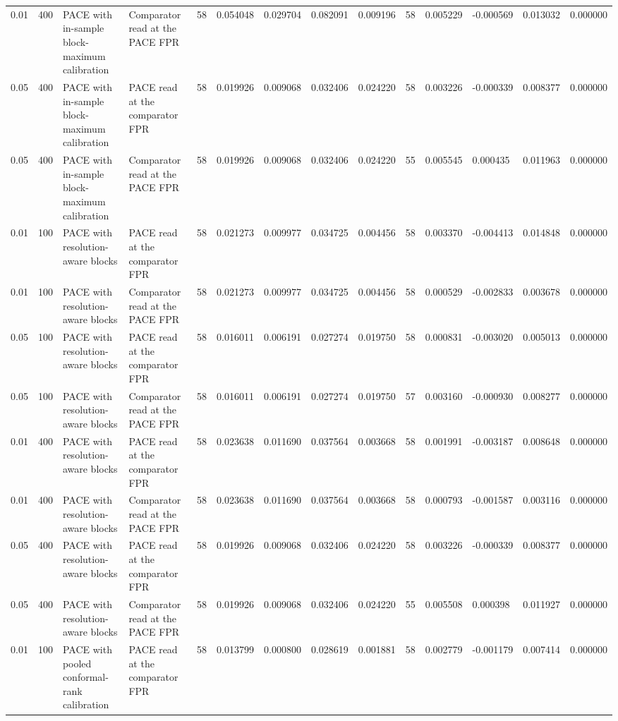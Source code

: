 \begin{tabular}{llllllllllllll}
0.01 & 400 & PACE with in-sample block-maximum calibration & Comparator read at the PACE FPR & 58 & 0.054048 & 0.029704 & 0.082091 & 0.009196 & 58 & 0.005229 & -0.000569 & 0.013032 & 0.000000 \\
0.05 & 400 & PACE with in-sample block-maximum calibration & PACE read at the comparator FPR & 58 & 0.019926 & 0.009068 & 0.032406 & 0.024220 & 58 & 0.003226 & -0.000339 & 0.008377 & 0.000000 \\
0.05 & 400 & PACE with in-sample block-maximum calibration & Comparator read at the PACE FPR & 58 & 0.019926 & 0.009068 & 0.032406 & 0.024220 & 55 & 0.005545 & 0.000435 & 0.011963 & 0.000000 \\
0.01 & 100 & PACE with resolution-aware blocks & PACE read at the comparator FPR & 58 & 0.021273 & 0.009977 & 0.034725 & 0.004456 & 58 & 0.003370 & -0.004413 & 0.014848 & 0.000000 \\
0.01 & 100 & PACE with resolution-aware blocks & Comparator read at the PACE FPR & 58 & 0.021273 & 0.009977 & 0.034725 & 0.004456 & 58 & 0.000529 & -0.002833 & 0.003678 & 0.000000 \\
0.05 & 100 & PACE with resolution-aware blocks & PACE read at the comparator FPR & 58 & 0.016011 & 0.006191 & 0.027274 & 0.019750 & 58 & 0.000831 & -0.003020 & 0.005013 & 0.000000 \\
0.05 & 100 & PACE with resolution-aware blocks & Comparator read at the PACE FPR & 58 & 0.016011 & 0.006191 & 0.027274 & 0.019750 & 57 & 0.003160 & -0.000930 & 0.008277 & 0.000000 \\
0.01 & 400 & PACE with resolution-aware blocks & PACE read at the comparator FPR & 58 & 0.023638 & 0.011690 & 0.037564 & 0.003668 & 58 & 0.001991 & -0.003187 & 0.008648 & 0.000000 \\
0.01 & 400 & PACE with resolution-aware blocks & Comparator read at the PACE FPR & 58 & 0.023638 & 0.011690 & 0.037564 & 0.003668 & 58 & 0.000793 & -0.001587 & 0.003116 & 0.000000 \\
0.05 & 400 & PACE with resolution-aware blocks & PACE read at the comparator FPR & 58 & 0.019926 & 0.009068 & 0.032406 & 0.024220 & 58 & 0.003226 & -0.000339 & 0.008377 & 0.000000 \\
0.05 & 400 & PACE with resolution-aware blocks & Comparator read at the PACE FPR & 58 & 0.019926 & 0.009068 & 0.032406 & 0.024220 & 55 & 0.005508 & 0.000398 & 0.011927 & 0.000000 \\
0.01 & 100 & PACE with pooled conformal-rank calibration & PACE read at the comparator FPR & 58 & 0.013799 & 0.000800 & 0.028619 & 0.001881 & 58 & 0.002779 & -0.001179 & 0.007414 & 0.000000 \\

\end{tabular}
